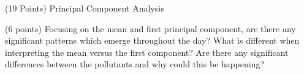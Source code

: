 \documentclass[12pt]{article}
\begin{document}
\begin{question}{(19 Points) Principal Component Analysis}
\begin{subquestion}



\end{subquestion}

\begin{subquestion}{(6 points) Focusing on the mean and first principal component, are there any significant patterns which emerge throughout the day?  What is different when interpreting the mean versus the first component?  Are there any significant differences between the pollutants and why could this be happening? }






\end{subquestion}

\end{question}

\end{document}
